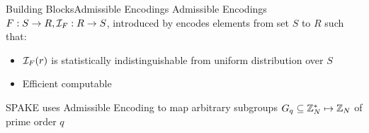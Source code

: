 \documentclass[notes,xcolor=dvipsnames]{beamer}
\begin{document}

\begin{frame}{Building Blocks}{Admissible Encodings}
	Admissible Encodings $F:S\rightarrow R, \mathcal{I}_F:R\rightarrow S$, introduced by \cite{BonehF01} encodes elements from set $S$ to $R$ such that: %
	\begin{itemize}
		\item $\mathcal{I}_F(r)$ is statistically indistinguishable from uniform distribution over $S$
		\item Efficient computable
	\end{itemize}
	
	\pause\vspace*{1em}
	
		SPAKE uses Admissible Encoding to map arbitrary subgroups $G_q \subseteq \mathbb{Z}_N^\ast \mapsto \mathbb{Z}_N$ of prime order $q$\\  ~\cite[Lemma~12]{pseudorandomSignatures} %
	
\end{frame}

%

\end{document}

